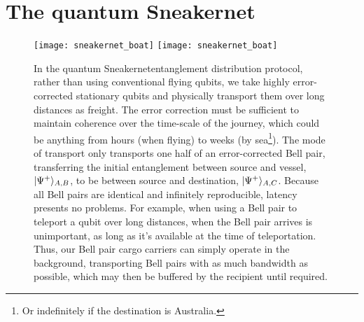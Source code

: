 %
%

\section{The quantum Sneakernet\texttrademark}


\begin{figure}[!htbp]
\pubmode
\texttt{[image: sneakernet\_boat]}
\else
\texttt{[image: sneakernet\_boat]}
\fi
\caption{In the quantum Sneakernet\texttrademark entanglement distribution protocol, rather than using conventional flying qubits, we take highly error-corrected stationary qubits and physically transport them over long distances as freight. The error correction must be sufficient to maintain coherence over the time-scale of the journey, which could be anything from hours (when flying) to weeks (by sea\footnote{Or indefinitely if the destination is Australia.}). The mode of transport only transports one half of an error-corrected Bell pair, transferring the initial entanglement between source and vessel, $|\Psi^+\rangle_{A,B}$, to be between source and destination, $|\Psi^+\rangle_{A,C}$. Because all Bell pairs are identical and infinitely reproducible, latency presents no problems. For example, when using a Bell pair to teleport a qubit over long distances, when the Bell pair arrives is unimportant, as long as it's available at the time of teleportation. Thus, our Bell pair cargo carriers can simply operate in the background, transporting Bell pairs with as much bandwidth as possible, which may then be buffered by the recipient until required.}\label{fig:sneakernet_boat}	
\end{figure}
